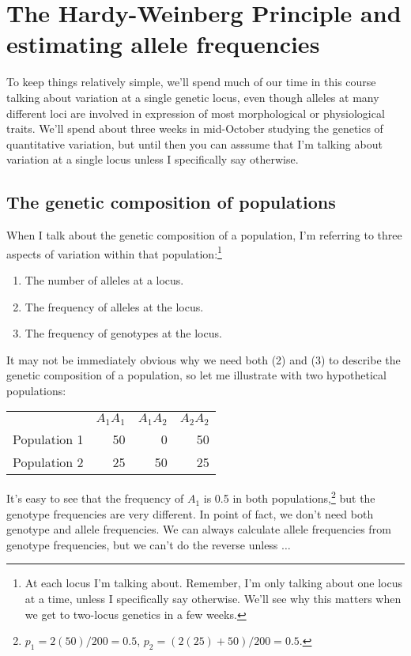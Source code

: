 \chapter{The Hardy-Weinberg Principle and estimating allele frequencies}

To keep things relatively simple, we'll spend much of our time in this
course talking about variation at a single genetic locus, even though
alleles at many different loci are involved in expression of most
morphological or physiological traits. We'll spend about three weeks
in mid-October studying the genetics of quantitative variation, but
until then you can asssume that I'm talking about variation at a
single locus unless I specifically say otherwise.

\section*{The genetic composition of populations}

When I talk about the genetic composition of a population, I'm
referring to three aspects of variation within that
population:\footnote{At each locus I'm talking about. Remember, I'm
  only talking about one locus at a time, unless I specifically say
  otherwise. We'll see why this matters when we get to two-locus
  genetics in a few weeks.}
\begin{enumerate}

\item The number of alleles at a locus.

\item The frequency of alleles at the locus.

\item The frequency of genotypes at the locus.

\end{enumerate}
It may not be immediately obvious why we need both (2) and
(3) to describe the genetic composition of a population, so let me
illustrate with two hypothetical populations:
\begin{center}
\begin{tabular}{lrrr}
             & $A_1A_1$ & $A_1A_2$ & $A_2A_2$ \\
Population 1 &       50 &        0 &       50 \\
Population 2 &       25 &       50 &       25 \\
\end{tabular}
\end{center}
It's easy to see that the frequency of $A_1$ is 0.5 in both
populations,\footnote{$p_1 = 2(50)/200 = 0.5$, $p_2 = (2(25) + 50)/200
= 0.5$.} but the genotype frequencies are very different. In point of
fact, we don't need both genotype and allele frequencies. We can
always calculate allele frequencies from genotype frequencies, but we
can't do the reverse unless $\dots$

